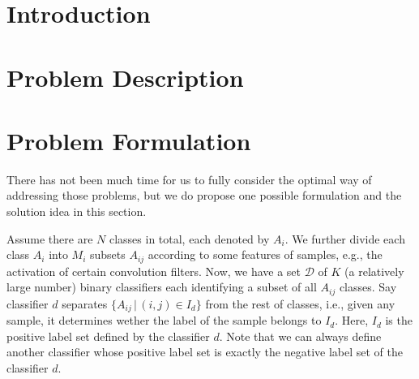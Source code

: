 \documentclass[acmsmall,nonacm]{acmart}\settopmatter{}
\begin{document}



\keywords{}  %


\maketitle

\section{Introduction}

\section{Problem Description}

\section{Problem Formulation}
There has not been much time for us to fully consider the optimal way of addressing those problems, but we do propose one possible formulation and the solution idea in this section.

Assume there are $N$ classes in total, each denoted by $A_i$.
We further divide each class $A_i$ into $M_i$ subsets $A_{ij}$ according to some features of samples, e.g., the activation of certain convolution filters.
Now, we have a set $\mathcal{D}$ of $K$ (a relatively large number) binary classifiers each identifying a subset of all $A_{ij}$ classes.
Say classifier $d$ separates $\{A_{ij} \,|\, (i, j) \in I_d\}$ from the rest of classes, i.e., given any sample, it determines wether the label of the sample belongs to $I_d$.
Here, $I_d$ is the positive label set defined by the classifier $d$.
Note that we can always define another classifier whose positive label set is exactly the negative label set of the classifier $d$.
\end{document}
